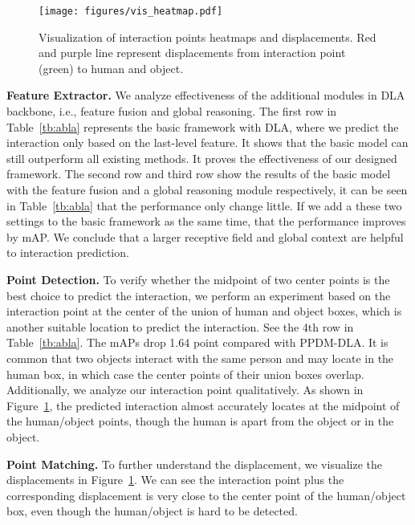 \documentclass[10pt,twocolumn,letterpaper]{article}
\begin{document}
\begin{figure}[htb]
  \vspace{-2mm}
  \begin{center}
  \texttt{[image: figures/vis\_heatmap.pdf]}
 \end{center}
 \vspace{-2mm}
  \caption{Visualization of interaction points heatmaps and  displacements. Red and purple line represent displacements from interaction point (green) to human and object. }
  \label{fig:heatmap}
  \vspace{-3.5mm}
\end{figure}


\noindent\textbf{Feature Extractor.} We analyze effectiveness of the additional modules in DLA backbone, i.e., feature fusion and global reasoning. The first row in Table~\ref{tb:abla} represents the basic framework with DLA, where we predict the interaction only based on the last-level feature. It shows that the basic model can still outperform all existing methods. It proves the effectiveness of our designed framework. The second row  and third row show the results of the basic model with the feature fusion and a global reasoning module respectively, it can be seen in Table~\ref{tb:abla} that the performance only change little. If we add a these two settings to the basic framework as the same time,  that the performance improves by  mAP. We conclude that a larger receptive field and global context are helpful to interaction prediction.

\noindent\textbf{Point Detection.}
To verify whether the midpoint of two center points is the best choice to predict the interaction, we perform an experiment based on the interaction point at the center of the union of human and object boxes, which is another suitable location to predict the interaction. See the 4th row in Table~\ref{tb:abla}. The mAPs drop 1.64 point compared with PPDM-DLA. It is common that two objects interact with the same person and may locate in the human box, in which case the center points of their union boxes overlap. Additionally, we analyze our interaction point qualitatively. As shown in Figure~\ref{fig:heatmap}, the predicted interaction almost accurately locates at the midpoint of the human/object points, though the human is apart from the object or in the object.

\noindent\textbf{Point Matching.}
To further understand the displacement, we visualize the displacements in Figure~\ref{fig:heatmap}. We can see the interaction point plus the corresponding displacement is very close to the center point of the human/object box, even though the human/object is hard to be detected.
\end{document}
